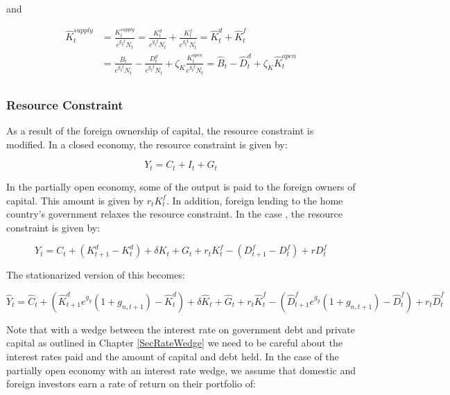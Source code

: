 and

\begin{equation}
  \begin{split}
  \hat{K}^{supply}_{t} &= \frac{K^{supply}_{t}}{e^{g_{y}t}N_{t}} = \frac{K^{d}_{t}}{e^{g_{y}t}N_{t}} + \frac{K^{f}_{t}}{e^{g_{y}t}N_{t}} = \hat{K}^{d}_{t} + \hat{K}^{f}_{t} \\
   & = \frac{B_{t}}{e^{g_{y}t}N_{t}} - \frac{D^{d}_{t}}{e^{g_{y}t}N_{t}} + \zeta_{K}\frac{K^{open}_{t}}{e^{g_{y}t}N_{t}} = \hat{B}_{t} - \hat{D}^{d}_{t} + \zeta_{K}\hat{K}^{open}_{t} \\
  \end{split}
\end{equation}

\subsubsection{Resource Constraint}

As a result of the foreign ownership of capital, the resource constraint is modified.  In a closed economy, the resource constraint is given by:

\begin{equation}
  Y_{t} = C_{t} + I_{t} + G_{t}
\end{equation}

In the partially open economy, some of the output is paid to the foreign owners of capital.  This amount is given by $r_{t}K^{f}_{t}$.  In addition, foreign lending to the home country's government relaxes the resource constraint.  In the case , the resource constraint is given by:

\begin{equation}
  Y_{t} = C_{t} + (K^{d}_{t+1} - K^{d}_{t}) + \delta K_{t} +  G_{t} + r_{t}K^{f}_{t} - (D^{f}_{t+1}-D^{f}_{t}) + rD^{f}_{t}
\end{equation}

The stationarized version of this becomes:

\begin{equation}
  \hat{Y}_{t} = \hat{C}_{t} + (\hat{K}^{d}_{t+1}e^{g_{y}}(1+g_{n,t+1}) - \hat{K}^{d}_{t}) + \delta \hat{K}_{t} +  \hat{G}_{t} + r_{t}\hat{K}^{f}_{t} - (\hat{D}^{f}_{t+1}e^{g_{y}}(1+g_{n,t+1})- \hat{D}^{f}_{t}) + r_{t}\hat{D}^{f}_{t}
\end{equation}

Note that with a wedge between the interest rate on government debt and private capital as outlined in Chapter \ref{SecRateWedge} we need to be careful about the interest rates paid and the amount of capital and debt held.  In the case of the partially open economy with an interest rate wedge, we assume that domestic and foreign investors earn a rate of return on their portfolio of:

